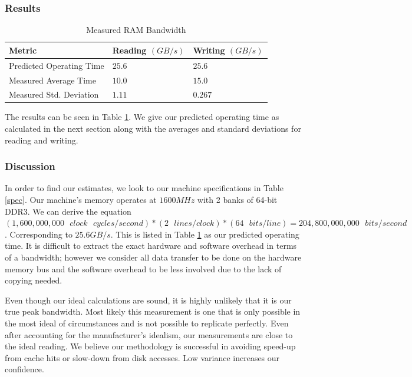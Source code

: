 \documentclass[sigconf]{acmart}
\begin{document}
\subsubsection{Results}
\begin{table}[h!]
\centering
\caption{Measured RAM Bandwidth}
\begin{tabular}{|l|l|l|}
\hline
\textbf{Metric}				& \textbf{Reading $(GB/s)$}	& \textbf{Writing $(GB/s)$}	\\ \hline
Predicted Operating Time	& $25.6$					& $25.6$					\\ \hline
Measured Average Time		& $10.0$					& $15.0$					\\ \hline
Measured Std. Deviation		& $1.11$					& $0.267$					\\ \hline
\end{tabular}
\label{RAMBandwidth}
\end{table}
The results can be seen in Table \ref{RAMBandwidth}. We give our predicted operating time as calculated in the next section along with the averages and standard deviations for reading and writing.

\subsubsection{Discussion}
In order to find our estimates, we look to our machine specifications in Table \ref{spec}. Our machine's memory operates at $1600MHz$ with 2 banks of 64-bit DDR3. We can derive the equation \((1,600,000,000 \text{ } clock\text{ }cycles / second)*(2\text{ }lines / clock)*(64\text{ }bits / line) = 204,800,000,000\text{ }bits / second\). Corresponding to \(25.6GB/s\). This is listed in Table \ref{RAMBandwidth} as our predicted operating time. It is difficult to extract the exact hardware and software overhead in terms of a bandwidth; however we consider all data transfer to be done on the hardware memory bus and the software overhead to be less involved due to the lack of copying needed.

Even though our ideal calculations are sound, it is highly unlikely that it is our true peak bandwidth. Most likely this measurement is one that is only possible in the most ideal of circumstances and is not possible to replicate perfectly. Even after accounting for the manufacturer's idealism, our measurements are close to the ideal reading. We believe our methodology is successful in avoiding speed-up from cache hits or slow-down from disk accesses. Low variance increases our confidence. 
\end{document}
